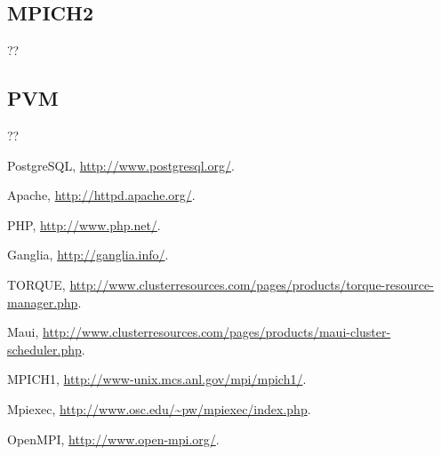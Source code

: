 \documentclass[a4paper,10pt,spanish]{article}
\begin{document}
\subsection{MPICH2}
??

\subsection{PVM}
??

\begin{thebibliography}{99}
PostgreSQL, \url{http://www.postgresql.org/}.

Apache, \url{http://httpd.apache.org/}.

PHP, \url{http://www.php.net/}.

Ganglia, \url{http://ganglia.info/}.

TORQUE, \url{http://www.clusterresources.com/pages/products/torque-resource-manager.php}.

Maui, \url{http://www.clusterresources.com/pages/products/maui-cluster-scheduler.php}.

MPICH1, \url{http://www-unix.mcs.anl.gov/mpi/mpich1/}.

Mpiexec, \url{http://www.osc.edu/~pw/mpiexec/index.php}.

OpenMPI, \url{http://www.open-mpi.org/}.

\end{thebibliography}
\end{document}
